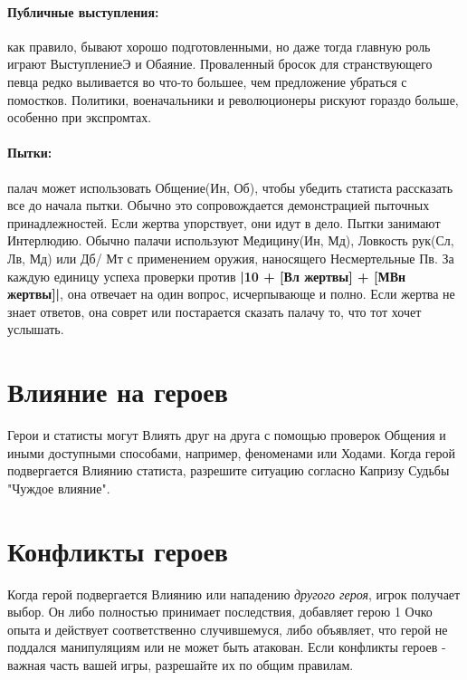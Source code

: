 \paragraph{Публичные выступления:} как правило, бывают хорошо подготовленными, но даже тогда главную роль играют ВыступлениеЭ и Обаяние. Проваленный бросок для странствующего певца редко выливается во что-то большее, чем предложение убраться с помостков. Политики, военачальники и революционеры рискуют гораздо больше, особенно при экспромтах.
\paragraph{Пытки:} палач может использовать Общение(Ин, Об),  чтобы убедить статиста рассказать все до начала пытки. Обычно это сопровождается демонстрацией пыточных принадлежностей. Если жертва упорствует, они идут в дело. Пытки занимают Интерлюдию. Обычно палачи используют Медицину(Ин, Мд), Ловкость рук(Сл, Лв, Мд) или Дб/ Мт с применением оружия, наносящего Несмертельные Пв. 
\newline За каждую единицу успеха проверки против \textbf{|10 + [Вл жертвы] + [МВн жертвы]|}, она отвечает на один вопрос, исчерпывающе и полно. Если жертва не знает ответов, она соврет или постарается сказать палачу то, что тот хочет услышать.

\section{Влияние на героев}
Герои и статисты могут Влиять друг на друга с помощью проверок Общения и иными доступными способами, например, феноменами или Ходами. 
\newline Когда герой подвергается Влиянию статиста, разрешите ситуацию согласно Капризу Судьбы "Чуждое влияние".

\section{Конфликты героев}
Когда герой подвергается Влиянию или нападению \textit{другого героя}, игрок получает выбор. Он либо полностью принимает последствия, добавляет герою 1 Очко опыта и действует соответственно случившемуся, либо объявляет, что герой не поддался манипуляциям или не может быть атакован. 
\newline Если конфликты героев - важная часть вашей игры, разрешайте их по общим правилам.



